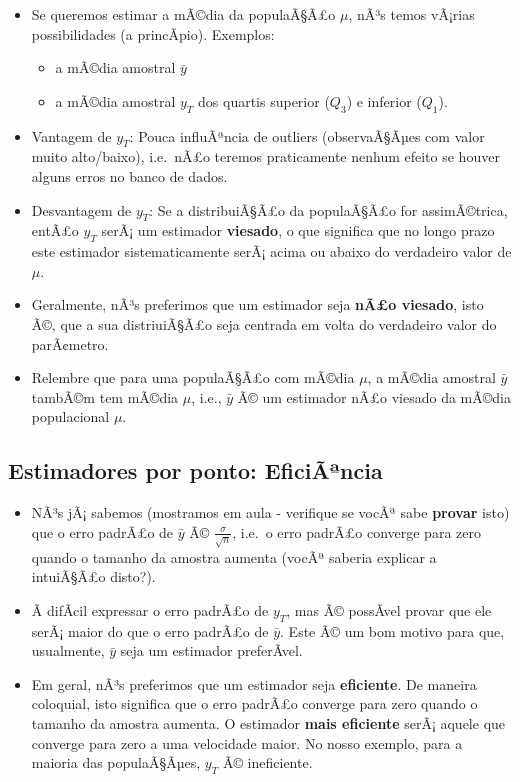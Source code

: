 \documentclass[]{article}
\providecommand{\tightlist}{%
  \setlength{\itemsep}{0pt}\setlength{\parskip}{0pt}}
\begin{document}
\begin{itemize}
\tightlist
\item
  Se queremos estimar a mÃ©dia da populaÃ§Ã£o \(\mu\), nÃ³s temos
  vÃ¡rias possibilidades (a princÃ­pio). Exemplos:

  \begin{itemize}
  \tightlist
  \item
    a mÃ©dia amostral \(\bar{y}\)
  \item
    a mÃ©dia amostral \(y_T\) dos quartis superior (\(Q_{3}\)) e
    inferior (\(Q_{1}\)).
  \end{itemize}
\item
  Vantagem de \(y_T\): Pouca influÃªncia de outliers (observaÃ§Ãµes com
  valor muito alto/baixo), i.e.~nÃ£o teremos praticamente nenhum efeito
  se houver alguns erros no banco de dados.
\item
  Desvantagem de \(y_T\): Se a distribuiÃ§Ã£o da populaÃ§Ã£o for
  assimÃ©trica, entÃ£o \(y_T\) serÃ¡ um estimador \textbf{viesado}, o
  que significa que no longo prazo este estimador sistematicamente serÃ¡
  acima ou abaixo do verdadeiro valor de \(\mu\).
\item
  Geralmente, nÃ³s preferimos que um estimador seja \textbf{nÃ£o
  viesado}, isto Ã©, que a sua distriuiÃ§Ã£o seja centrada em volta do
  verdadeiro valor do parÃ¢metro.
\item
  Relembre que para uma populaÃ§Ã£o com mÃ©dia \(\mu\), a mÃ©dia
  amostral \(\bar{y}\) tambÃ©m tem mÃ©dia \(\mu\), i.e., \(\bar{y}\) Ã©
  um estimador nÃ£o viesado da mÃ©dia populacional \(\mu\).
\end{itemize}

\subsection{Estimadores por ponto:
EficiÃªncia}\label{estimadores-por-ponto-eficiancia}

\begin{itemize}
\tightlist
\item
  NÃ³s jÃ¡ sabemos (mostramos em aula - verifique se vocÃª sabe
  \textbf{provar} isto) que o erro padrÃ£o de \(\bar{y}\) Ã©
  \(\frac{\sigma}{\sqrt{n}}\), i.e.~o erro padrÃ£o converge para zero
  quando o tamanho da amostra aumenta (vocÃª saberia explicar a
  intuiÃ§Ã£o disto?).
\item
  Ã difÃ­cil expressar o erro padrÃ£o de \(y_T\), mas Ã© possÃ­vel
  provar que ele serÃ¡ maior do que o erro padrÃ£o de \(\bar{y}\). Este
  Ã© um bom motivo para que, usualmente, \(\bar{y}\) seja um estimador
  preferÃ­vel.
\item
  Em geral, nÃ³s preferimos que um estimador seja \textbf{eficiente}. De
  maneira coloquial, isto significa que o erro padrÃ£o converge para
  zero quando o tamanho da amostra aumenta. O estimador \textbf{mais
  eficiente} serÃ¡ aquele que converge para zero a uma velocidade maior.
  No nosso exemplo, para a maioria das populaÃ§Ãµes, \(y_T\) Ã©
  ineficiente.
\end{itemize}
\end{document}
